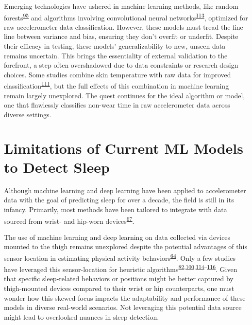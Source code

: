 \documentclass[
  10pt,
]{scrbook}
\begin{document}
Emerging technologies have ushered in machine learning methods, like
random
forests\textsuperscript{\protect\hyperlink{ref-sundararajan_sleep_2021}{95}}
and algorithms involving convolutional neural
networks\textsuperscript{\protect\hyperlink{ref-syed_novel_2021}{113}},
optimized for raw accelerometer data classification. However, these
models must tread the fine line between variance and bias, ensuring they
don't overfit or underfit. Despite their efficacy in testing, these
models' generalizability to new, unseen data remains uncertain. This
brings the essentiality of external validation to the forefront, a step
often overshadowed due to data constraints or research design choices.
Some studies combine skin temperature with raw data for improved
classification\textsuperscript{\protect\hyperlink{ref-zhou_classification_2015}{111}},
but the full effects of this combination in machine learning remain
largely unexplored. The quest continues for the ideal algorithm or
model, one that flawlessly classifies non-wear time in raw accelerometer
data across diverse settings.

\hypertarget{limitations-of-current-ml-models-to-detect-sleep}{%
\section{Limitations of Current ML Models to Detect
Sleep}\label{limitations-of-current-ml-models-to-detect-sleep}}

Although machine learning and deep learning have been applied to
accelerometer data with the goal of predicting sleep for over a decade,
the field is still in its infancy. Primarily, most methods have been
tailored to integrate with data sourced from wrist- and hip-worn
devices\textsuperscript{\protect\hyperlink{ref-conley_agreement_2019}{67}}.

The use of machine learning and deep learning on data collected via
devices mounted to the thigh remains unexplored despite the potential
advantages of this sensor location in estimating physical activity
behaviors\textsuperscript{\protect\hyperlink{ref-bruxf8nd_2020}{64}}.
Only a few studies have leveraged this sensor-location for heuristic
algorithms\textsuperscript{\protect\hyperlink{ref-johansson_development_2023}{82},\protect\hyperlink{ref-winkler_identifying_2016}{100},\protect\hyperlink{ref-carlson_validity_2021}{114}--\protect\hyperlink{ref-van_der_berg_identifying_2016}{116}}.
Given that specific sleep-related behaviors or positions might be better
captured by thigh-mounted devices compared to their wrist or hip
counterparts, one must wonder how this skewed focus impacts the
adaptability and performance of these models in diverse real-world
scenarios. Not leveraging this potential data source might lead to
overlooked nuances in sleep detection.
\end{document}
